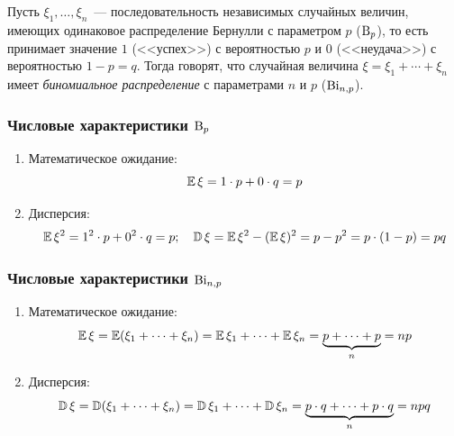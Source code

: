     \begin{defn}
        Пусть $\xi_1, \ldots, \xi_n$~--- последовательность независимых случайных величин, имеющих одинаковое распределение Бернулли с параметром $p$ ($\operatorname{\mathrm{B}}_{p}$), то есть принимает значение $1$ (<<успех>>) с вероятностью $p$ и $0$ (<<неудача>>) с вероятностью $1 - p = q$. Тогда говорят, что случайная величина $\xi = \xi_1 + \cdots + \xi_n$ имеет \textit{биномиальное распределение} с параметрами $n$ и $p$ ($\operatorname{\mathrm{Bi}}_{n, p}$).
    \end{defn}
    
    \subsubsection{Числовые характеристики $\operatorname{\mathrm{B}}_{p}$}
    \begin{enumerate}
        \item Математическое ожидание:
        \begin{equation*}
            \operatorname{\mathbb{E}} \xi =  1 \cdot p + 0 \cdot q = p
        \end{equation*}
        \item Дисперсия:
            \begin{equation*}
                \operatorname{\mathbb{E}} \xi^2 = 1^2 \cdot p + 0^2 \cdot q = p; \quad \operatorname{\mathbb{D}}\xi = \operatorname{\mathbb{E}} \xi^2 - (\operatorname{\mathbb{E}} \xi)^2 = p - p^2 = p \cdot (1 - p) = pq
            \end{equation*}
    \end{enumerate}
    
    \subsubsection{Числовые характеристики $\operatorname{\mathrm{Bi}}_{n, p}$}
    \begin{enumerate}
        \item Математическое ожидание:
        \begin{equation*}
            \operatorname{\mathbb{E}} \xi = \operatorname{\mathbb{E}} (\xi_1 + \cdots + \xi_n) = \operatorname{\mathbb{E}} \xi_1 + \cdots + \operatorname{\mathbb{E}} \xi_n = \underbrace{p + \cdots + p}_{n} = np
        \end{equation*}
        \item Дисперсия:
        \begin{equation*}
            \operatorname{\mathbb{D}}\xi = \operatorname{\mathbb{D}}(\xi_1 + \cdots + \xi_n) = \operatorname{\mathbb{D}}\xi_1 + \cdots + \operatorname{\mathbb{D}}\xi_n = \underbrace{p \cdot q + \cdots + p \cdot q}_{n} = npq
        \end{equation*}
    \end{enumerate}
    

